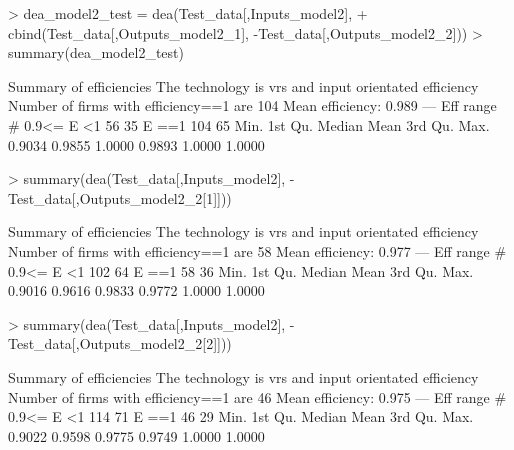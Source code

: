 \documentclass[12pt,]{article}
\begin{document}
\begin{Schunk}
\begin{Sinput}
> dea_model2_test = dea(Test_data[,Inputs_model2],
+                       cbind(Test_data[,Outputs_model2_1], -Test_data[,Outputs_model2_2]))
> summary(dea_model2_test)
\end{Sinput}
\begin{Soutput}
Summary of efficiencies
The technology is vrs and input orientated efficiency
Number of firms with efficiency==1 are 104 
Mean efficiency: 0.989 
---                
  Eff range        #  %
  0.9<= E <1      56 35
        E ==1    104 65
   Min. 1st Qu.  Median    Mean 3rd Qu.    Max. 
 0.9034  0.9855  1.0000  0.9893  1.0000  1.0000 
\end{Soutput}
\begin{Sinput}
> summary(dea(Test_data[,Inputs_model2], -Test_data[,Outputs_model2_2[1]]))
\end{Sinput}
\begin{Soutput}
Summary of efficiencies
The technology is vrs and input orientated efficiency
Number of firms with efficiency==1 are 58 
Mean efficiency: 0.977 
---                
  Eff range        #  %
  0.9<= E <1     102 64
        E ==1     58 36
   Min. 1st Qu.  Median    Mean 3rd Qu.    Max. 
 0.9016  0.9616  0.9833  0.9772  1.0000  1.0000 
\end{Soutput}
\begin{Sinput}
> summary(dea(Test_data[,Inputs_model2], -Test_data[,Outputs_model2_2[2]]))
\end{Sinput}
\begin{Soutput}
Summary of efficiencies
The technology is vrs and input orientated efficiency
Number of firms with efficiency==1 are 46 
Mean efficiency: 0.975 
---                
  Eff range        #  %
  0.9<= E <1     114 71
        E ==1     46 29
   Min. 1st Qu.  Median    Mean 3rd Qu.    Max. 
 0.9022  0.9598  0.9775  0.9749  1.0000  1.0000 
\end{Soutput}
\end{Schunk}

\end{document}
